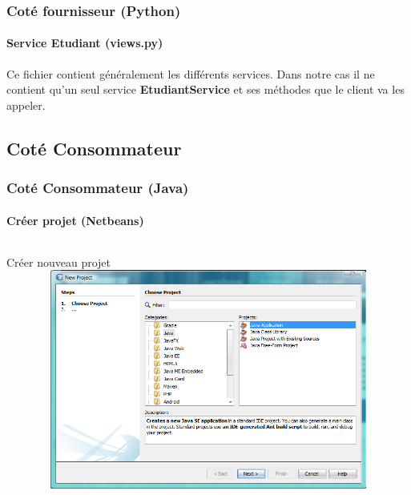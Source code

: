 \begin{frame}
\frametitle{Coté fournisseur (Python)}
\framesubtitle{Service Etudiant (views.py)}
\transsplitverticalout[duration=1.5]
Ce fichier contient généralement les différents services. Dans notre cas il ne contient qu'un seul service \textcolor{backgroundcolor}{\textbf{EtudiantService}} et ses méthodes que le client va les appeler.
\end{frame}

\subsection{Coté Consommateur}
\begin{frame}
\frametitle{Coté Consommateur (Java)}
\framesubtitle{Créer projet (Netbeans)}
\transboxin[duration=1]
\begin{columns}
\begin{column}{16cm}
 \begin{alertblock}{Créer nouveau projet}
 \includegraphics[width=16cm,height=7.2cm]{images/clientCaptures/etape1_new_project.png}
  \end{alertblock}
\end{column}
\end{columns}
\end{frame}


